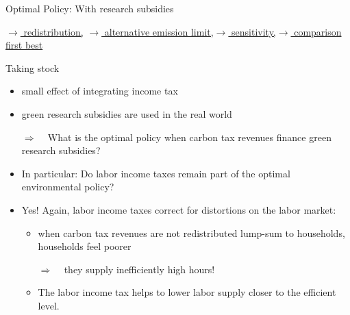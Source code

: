 \documentclass[11pt,aspectratio=169]{beamer}
\newcommand{\ar}{$\Rightarrow$ \ }
\begin{document}
\begin{frame}{Optimal Policy: With research subsidies}
\hypertarget{backOPT}{}
\vspace{-4mm}
\hfill

\hyperlink{Redis}{\tiny{$\rightarrow$ redistribution,}}
\hyperlink{altems}{\tiny{$\rightarrow$ alternative emission limit,}}\hyperlink{sensphi}{\tiny{$\rightarrow$ sensitivity,}}\hyperlink{compfb}{\tiny{$\rightarrow$ comparison first best}}
\end{frame}



\begin{frame}{Taking stock}
	\begin{itemize}
		\item small effect of integrating income tax
		\item green research subsidies are used in the real world
		\item[\ar]  What is the optimal policy when carbon tax revenues finance green research subsidies?
		\item In particular: Do labor income taxes remain part of the optimal environmental policy?
		\item Yes! Again, labor income taxes correct for distortions on the labor market:
		\begin{itemize}
			\item when carbon tax revenues are not redistributed lump-sum to households, households feel poorer
			\item[\ar] they supply inefficiently high hours!
			\item The labor income tax helps to lower labor supply closer to the efficient level.
		\end{itemize}
	\end{itemize}
\end{frame}
\end{document}
